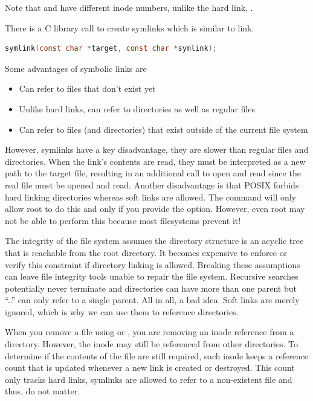 \begin{enumerate}
        Note that  and  have different inode numbers, unlike the hard link, .

        There is a C library call to create symlinks which is similar to link.

\begin{lstlisting}[language=C]
symlink(const char *target, const char *symlink);
\end{lstlisting}

        Some advantages of symbolic links are

        \begin{itemize}
            \tightlist
                \item Can refer to files that don't exist yet
                \item Unlike hard links, can refer to directories as well as regular files
                \item Can refer to files (and directories) that exist outside of the current file system
        \end{itemize}

        However, symlinks have a key disadvantage, they are slower than regular files and directories.
        When the link's contents are read, they must be interpreted as a new path to the target file, resulting in an additional call to open and read since the real file must be opened and read.
        Another disadvantage is that POSIX forbids hard linking directories whereas soft links are allowed.
        The  command will only allow root to do this and only if you provide the  option.
        However, even root may not be able to perform this because most filesystems prevent it!
\end{enumerate}

The integrity of the file system assumes the directory structure is an acyclic tree that is reachable from the root directory.
It becomes expensive to enforce or verify this constraint if directory linking is allowed.
Breaking these assumptions can leave file integrity tools unable to repair the file system.
Recursive searches potentially never terminate and directories can have more than one parent but ``..'' can only refer to a single parent.
All in all, a bad idea.
Soft links are merely ignored, which is why we can use them to reference directories.

When you remove a file using  or , you are removing an inode reference from a directory.
However, the inode may still be referenced from other directories.
To determine if the contents of the file are still required, each inode keeps a reference count that is updated whenever a new link is created or destroyed.
This count only tracks hard links, symlinks are allowed to refer to a non-existent file and thus, do not matter.

